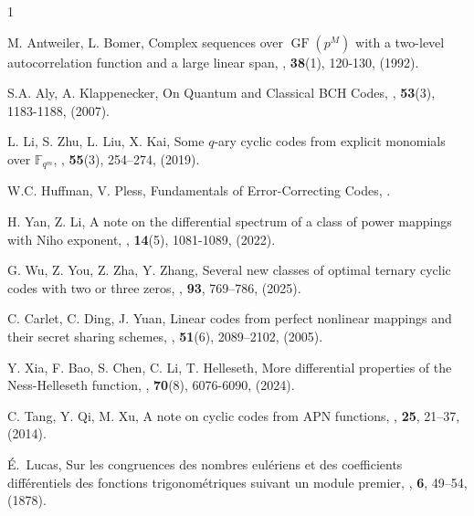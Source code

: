 \documentclass[pdflatex,sn-mathphys-num]{sn-jnl}%
\theoremstyle{thmstyleone}%
\theoremstyle{thmstyletwo}%
\theoremstyle{thmstylethree}%
\begin{document}
\begin{thebibliography}{1}
    
    M. Antweiler, L. Bomer, \newblock Complex sequences over $\operatorname{GF}(p^M)$ with a two-level autocorrelation
    function and a large linear span, , \textbf{38}(1), 120-130, (1992).
    
	S.A. Aly, A. Klappenecker, \newblock On Quantum and Classical BCH Codes, , \textbf{53}(3), 1183-1188, (2007).

 L. Li, S. Zhu, L. Liu, X. Kai, \newblock Some $q$-ary cyclic codes from explicit monomials over $\mathbb{F}_{q^m}$, , \textbf{55}(3), 254–274, (2019).
    
	W.C. Huffman, V. Pless, \newblock Fundamentals of Error-Correcting Codes, .

H. Yan, Z. Li, \newblock A note on the differential spectrum of a class of power mappings with Niho exponent, , \textbf{14}(5), 1081-1089, (2022).

    G. Wu, Z. You, Z. Zha, Y. Zhang, \newblock Several new classes of optimal ternary cyclic codes with two or three zeros, , \textbf{93}, 769–786, (2025).

C. Carlet, C. Ding, J. Yuan,  \newblock Linear codes from perfect nonlinear mappings and their secret sharing schemes, , \textbf{51}(6), 2089–2102, (2005).    

Y. Xia, F. Bao, S. Chen, C. Li, T. Helleseth, \newblock More differential properties of the Ness-Helleseth function, , \textbf{70}(8), 6076-6090, (2024).

C. Tang, Y. Qi, M. Xu, \newblock A note on cyclic codes from APN functions, , \textbf{25}, 21–37, (2014).

   \'{E}.~Lucas, \newblock Sur les congruences des nombres eul\'eriens et des coefficients diff\'erentiels des fonctions trigonom\'etriques suivant un module premier, , \textbf{6}, 49–54, (1878).


\end{thebibliography}
\end{document}

